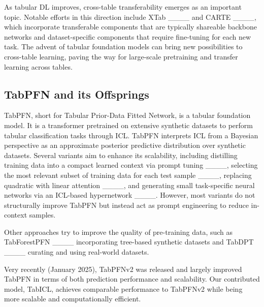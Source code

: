 As tabular DL improves, cross-table transferability emerges as an important topic. Notable efforts in this direction include XTab ____ and CARTE ____, which incorporate transferable components that are typically shareable backbone networks and dataset-specific components that require fine-tuning for each new task. The advent of tabular foundation models can bring new possibilities to cross-table learning, paving the way for large-scale pretraining and transfer learning across tables.

\subsection{TabPFN and its Offsprings}
\label{ss:tabpfn_offsprings}

TabPFN, short for Tabular Prior-Data Fitted Network, is a tabular foundation model. It is a transformer pretrained on extensive synthetic datasets to perform tabular classification tasks through ICL. TabPFN interprets ICL from a Bayesian perspective as an approximate posterior predictive distribution over synthetic datasets. Several variants aim to enhance its scalability, including distilling training data into a compact learned context via prompt tuning ____, selecting the most relevant subset of training data for each test sample ____, replacing quadratic with linear attention ____, and generating small task-specific neural networks via an ICL-based hypernetwork ____. However, most variants do not structurally improve TabPFN but instead act as prompt engineering to reduce in-context samples.

Other approaches try to improve the quality of pre-training data, such as TabForestPFN ____ incorporating tree-based synthetic datasets and TabDPT ____ curating and using real-world datasets.

Very recently (January 2025), TabPFNv2 was released and largely improved TabPFN in terms of both prediction performance and scalability. Our contributed model, TabICL, achieves comparable performance to TabPFNv2 while being more scalable and computationally efficient.